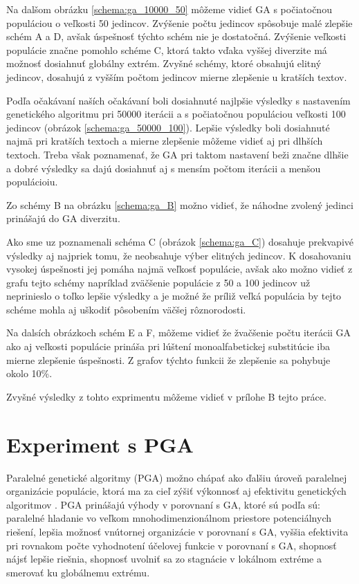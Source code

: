 Na dalšom obrázku \ref{schema:ga_10000_50} môžeme vidieť GA s počiatočnou populáciou o veľkosti 50 jedincov. Zvýšenie počtu jedincov spôsobuje malé zlepšie  schém A a D, avšak úspešnosť týchto schém nie je dostatočná. Zvýšenie veľkosti populácie značne pomohlo schéme C, ktorá takto vďaka vyššej diverzite má možnosť dosiahnuť globálny extrém. Zvyšné schémy, ktoré obsahujú elitný jedincov, dosahujú z vyšším počtom jedincov mierne zlepšenie u kratších textov. 


Podľa očakávaní naších očakávaní boli dosiahnuté najlpšie výsledky s nastavením genetického algoritmu pri 50000 iterácii a s počiatočnou populáciou veľkosti 100 jedincov (obrázok \ref{schema:ga_50000_100}). Lepšie výsledky boli dosiahnuté najmä pri kratších textoch a mierne zlepšenie môžeme vidieť aj pri dlhších textoch. Treba však poznamenať, že GA pri taktom nastavení beži značne dlhšie a dobré výsledky sa dajú dosiahnuť aj s mensím počtom iterácii a menšou populácioiu. 


Zo schémy B na obrázku \ref{schema:ga_B} možno vidieť, že náhodne zvolený jedinci prinášajú do GA diverzitu.


Ako sme uz poznamenali schéma C (obrázok \ref{schema:ga_C}) dosahuje prekvapivé výsledky aj najpriek tomu, že neobsahuje výber elitných jedincov. K dosahovaniu vysokej úspešnosti jej pomáha najmä veľkosť populácie, avšak ako možno vidieť z grafu tejto schémy napríklad zväčšenie populácie z 50 a 100 jedincov už neprinieslo o toľko lepšie výsledky a je možné že príliž veľká populácia by tejto schéme mohla aj uškodiť pôsobením väčšej rôznorodosti.


Na dalsích obrázkoch schém E a F, môžeme vidieť že žvačšenie počtu iterácii GA ako aj veľkosti populácie prináša pri lúštení monoalfabetickej substitúcie iba mierne zlepšenie úspešnosti. Z grafov týchto funkcii že zlepšenie sa pohybuje okolo 10\%.



Zvyšné výsledky z tohto exprimentu môžeme vidieť v prílohe B tejto práce.
\section{Experiment s PGA}
Paralelné genetické algoritmy (PGA) možno chápať ako ďalšiu úroveň paralelnej organizácie populácie, ktorá ma za cieľ zýšiť výkonnosť aj efektivitu genetických algoritmov \cite{pea}.
PGA prinášajú výhody v porovnaní s GA, ktoré sú podľa \cite{pea} sú: paralelné hladanie vo veľkom mnohodimenzionálnom priestore potenciálnych riešení, lepšia možnosť vnútornej organizácie v porovnaní s GA, vyššia efektivita pri rovnakom počte vyhodnotení účelovej funkcie v porovnaní s GA, shopnosť nájsť lepšie riešnia, shopnosť uvolniť sa zo stagnácie v lokálnom extréme a smerovať ku globálnemu extrému.

